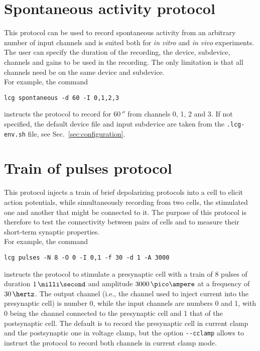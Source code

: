\section{Spontaneous activity protocol}
This protocol can be used to record spontaneous activity from an
arbitrary number of input channels and is suited both for \emph{in
vitro} and \emph{in vivo} experiments. The user can specify the
duration of the recording, the device, subdevice, channels and gains
to be used in the recording. The only limitation is that all channels
need be on the same device and subdevice.\\
For example, the command
\begin{lstlisting}
lcg spontaneous -d 60 -I 0,1,2,3
\end{lstlisting}
instructs the protocol to record for $60\,\second$ from channels 0, 1,
2 and 3. If not specified, the default device file and input subdevice
are taken from the \verb+.lcg-env.sh+ file, see
Sec.~\ref{sec:configuration}.

\section{Train  of pulses protocol} \label{sec:train}
This protocol injects a train of brief depolarizing protocols into a
cell to elicit action potentials, while simultaneously recording from
two cells, the stimulated one and another that might be connected to
it. The purpose of this protocol is therefore to test the connectivity
between pairs of cells and to measure their short-term synaptic
properties.\\
For example, the command
\begin{lstlisting}
lcg pulses -N 8 -O 0 -I 0,1 -f 30 -d 1 -A 3000
\end{lstlisting}
instructs the protocol to stimulate a presynaptic cell with a train of
8 pulses of duration $1\,\milli\second$ and amplitude
$3000\,\pico\ampere$ at a frequency of $30\,\hertz$. The output
channel (i.e., the channel used to inject current into the presynaptic
cell) is number 0, while the input channels are numbers 0 and 1, with
0 being the channel connected to the presynaptic cell and 1 that of
the postsynaptic cell. The default is to record the presynaptic cell
in current clamp and the postsynaptic one in voltage clamp, but the
option \verb+--cclamp+ allows to instruct the protocol to record both
channels in current clamp mode.

